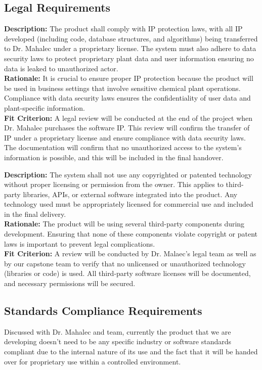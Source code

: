 \documentclass[12pt]{article}
\begin{document}
\subsection{Legal Requirements}
\begin{tcolorbox}[title=LR1]
  \textbf{Description:} The product shall comply with IP protection laws, with all IP developed (including code, database structures, and algorithms) being transferred to Dr. Mahalec under a proprietary license. The system must also adhere to data security laws to protect proprietary plant data and user information ensuring no data is leaked to unauthorized actor. \\
  \textbf{Rationale:} It is crucial to ensure proper IP protection because the product will be used in business settings that involve sensitive chemical plant operations. Compliance with data security laws ensures the confidentiality of user data and plant-specific information. \\
  \textbf{Fit Criterion:}  A legal review will be conducted at the end of the project when Dr. Mahalec purchases the software IP. This review will confirm the transfer of IP under a proprietary license and ensure compliance with data security laws. The documentation will confirm that no unauthorized access to the system’s information is possible, and this will be included in the final handover.
\end{tcolorbox}
\begin{tcolorbox}[title=LR2]
  \textbf{Description:} The system shall not use any copyrighted or patented technology without proper licensing or permission from the owner. This applies to third-party libraries, APIs, or external software integrated into the product. Any technology used must be appropriately licensed for commercial use and included in the final delivery. \\
  \textbf{Rationale:} The product will be using several third-party components during development. Ensuring that none of these components violate copyright or patent laws is important to prevent legal complications. \\
  \textbf{Fit Criterion:}  A review will be conducted by Dr. Malaec's legal team as well as by our capstone team to verify that no unlicensed or unauthorized technology (libraries or code) is used. All third-party software licenses will be documented, and necessary permissions will be secured.
\end{tcolorbox}
\subsection{Standards Compliance Requirements}
Discussed with Dr. Mahalec and team, currently the product that we are developing doesn’t need to be any specific industry or software standards compliant due to the internal nature of its use and the fact that it will be handed over for proprietary use within a controlled environment.
\end{document}
